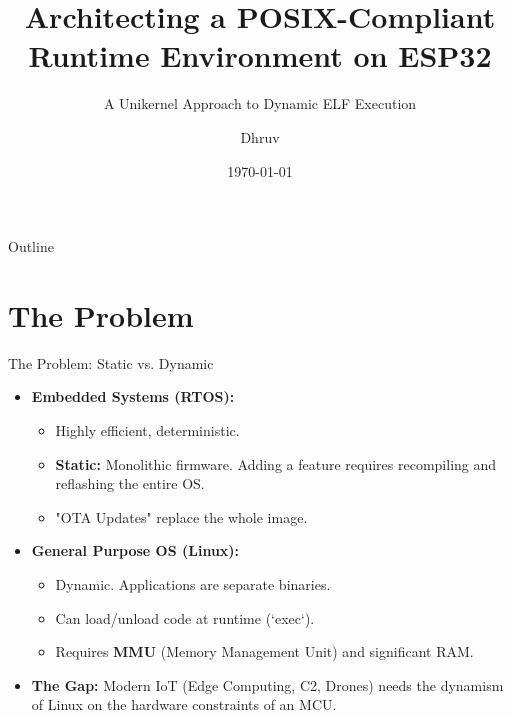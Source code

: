 \documentclass{beamer}
\title[ESP32 Linux Compatibility Layer]{Architecting a POSIX-Compliant Runtime Environment on ESP32}
\subtitle{A Unikernel Approach to Dynamic ELF Execution}
\author{Dhruv}
\institute[University]{Department of Computer Science}
\date{\today}
\begin{document}
\begin{frame}
    \titlepage
\end{frame}

\begin{frame}{Outline}
    \tableofcontents
\end{frame}

\section{The Problem}
\begin{frame}{The Problem: Static vs. Dynamic}
    \begin{itemize}
        \item \textbf{Embedded Systems (RTOS):}
        \begin{itemize}
            \item Highly efficient, deterministic.
            \item \textbf{Static:} Monolithic firmware. Adding a feature requires recompiling and reflashing the entire OS.
            \item "OTA Updates" replace the whole image.
        \end{itemize}
        \vspace{0.5cm}
        \item \textbf{General Purpose OS (Linux):}
        \begin{itemize}
            \item Dynamic. Applications are separate binaries.
            \item Can load/unload code at runtime (`exec`).
            \item Requires \textbf{MMU} (Memory Management Unit) and significant RAM.
        \end{itemize}
        \vspace{0.5cm}
        \item \textbf{The Gap:} Modern IoT (Edge Computing, C2, Drones) needs the dynamism of Linux on the hardware constraints of an MCU.
    \end{itemize}
\end{frame}

\end{document}
